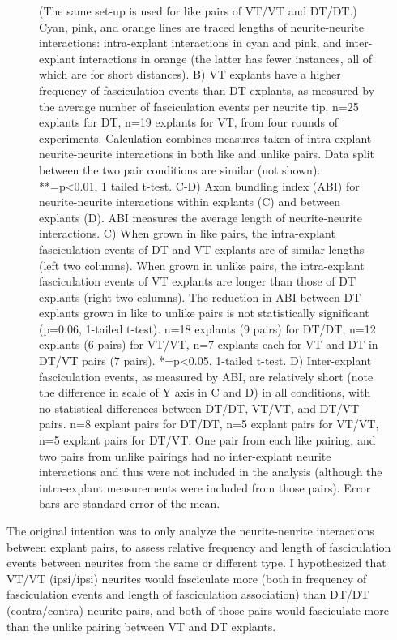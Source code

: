 \begin{figure}[hbtp]
\begin{center}
{		(The same set-up is used for like pairs of VT/VT and DT/DT.)
		Cyan, pink, and orange lines are traced lengths of neurite-neurite interactions: intra-explant interactions in cyan and pink, and inter-explant interactions in orange (the latter has fewer instances, all of which are for short distances).
		B) VT explants have a higher frequency of fasciculation events than DT explants, as measured by the average number of fasciculation events per neurite tip.
		n=25 explants for DT, n=19 explants for VT, from four rounds of experiments. Calculation combines measures taken of intra-explant neurite-neurite interactions in both like and unlike pairs.
		Data split between the two pair conditions are similar (not shown).
		**=p<0.01, 1 tailed t-test.
		C-D) Axon bundling index (ABI) for neurite-neurite interactions within explants (C) and between explants (D).
		ABI measures the average length of neurite-neurite interactions.
		C) When grown in like pairs, the intra-explant fasciculation events of DT and VT explants are of similar lengths (left two columns).
		When grown in unlike pairs, the intra-explant fasciculation events of VT explants are longer than those of DT explants (right two columns).
		The reduction in ABI between DT explants grown in like to unlike pairs is not statistically significant (p=0.06, 1-tailed t-test).
		n=18 explants (9 pairs) for DT/DT, n=12 explants (6 pairs) for VT/VT, n=7 explants each for VT and DT in DT/VT pairs (7 pairs).
		*=p<0.05, 1-tailed t-test.
		D) Inter-explant fasciculation events, as measured by ABI, are relatively short (note the difference in scale of Y axis in C and D) in all conditions, with no statistical differences between DT/DT, VT/VT, and DT/VT pairs.
		n=8 explant pairs for DT/DT, n=5 explant pairs for VT/VT, n=5 explant pairs for DT/VT.
		One pair from each like pairing, and two pairs from unlike pairings had no inter-explant neurite interactions and thus were not included in the analysis (although the intra-explant measurements were included from those pairs).
		Error bars are standard error of the mean.
		}
        \label{Figures/EnFaceData}
    \end{center}
\end{figure}
The original intention was to only analyze the neurite-neurite interactions between explant pairs, to assess relative frequency and length of fasciculation events between neurites from the same or different type.
I hypothesized that VT/VT (ipsi/ipsi) neurites would fasciculate more (both in frequency of fasciculation events and length of fasciculation association) than DT/DT (contra/contra) neurite pairs, and both of those pairs would fasciculate more than the unlike pairing between VT and DT explants.
